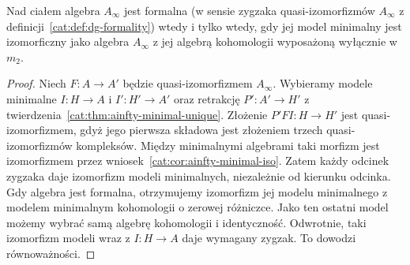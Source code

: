 \begin{stwierdzenie}\label{cat:prop:ainfty-formality-minimal}
Nad ciałem algebra $A_\infty$ jest formalna (w sensie zygzaka quasi-izomorfizmów $A_\infty$ z definicji~\ref{cat:def:dg-formality}) wtedy i tylko wtedy, gdy jej model minimalny jest izomorficzny jako algebra $A_\infty$ z jej algebrą kohomologii wyposażoną wyłącznie w $m_2$.
\end{stwierdzenie}
\begin{proof}
Niech $F:A\to A'$ będzie quasi-izomorfizmem $A_\infty$. Wybieramy modele minimalne $I:H\to A$ i $I':H'\to A'$ oraz retrakcję $P':A'\to H'$ z twierdzenia~\ref{cat:thm:ainfty-minimal-unique}. Złożenie $P'FI:H\to H'$ jest quasi-izomorfizmem, gdyż jego pierwsza składowa jest złożeniem trzech quasi-izomorfizmów kompleksów. Między minimalnymi algebrami taki morfizm jest izomorfizmem przez wniosek~\ref{cat:cor:ainfty-minimal-iso}. Zatem każdy odcinek zygzaka daje izomorfizm modeli minimalnych, niezależnie od kierunku odcinka. Gdy algebra jest formalna, otrzymujemy izomorfizm jej modelu minimalnego z modelem minimalnym kohomologii o zerowej różniczce. Jako ten ostatni model możemy wybrać samą algebrę kohomologii i identyczność. Odwrotnie, taki izomorfizm modeli wraz z $I:H\to A$ daje wymagany zygzak. To dowodzi równoważności.
\end{proof}

